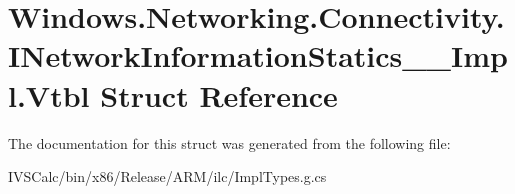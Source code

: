 \hypertarget{struct_windows_1_1_networking_1_1_connectivity_1_1_i_network_information_statics_____impl_1_1_vtbl}{}\section{Windows.\+Networking.\+Connectivity.\+I\+Network\+Information\+Statics\+\_\+\+\_\+\+Impl.\+Vtbl Struct Reference}
\label{struct_windows_1_1_networking_1_1_connectivity_1_1_i_network_information_statics_____impl_1_1_vtbl}


The documentation for this struct was generated from the following file\+:\begin{DoxyCompactItemize}
\item 
I\+V\+S\+Calc/bin/x86/\+Release/\+A\+R\+M/ilc/Impl\+Types.\+g.\+cs\end{DoxyCompactItemize}
